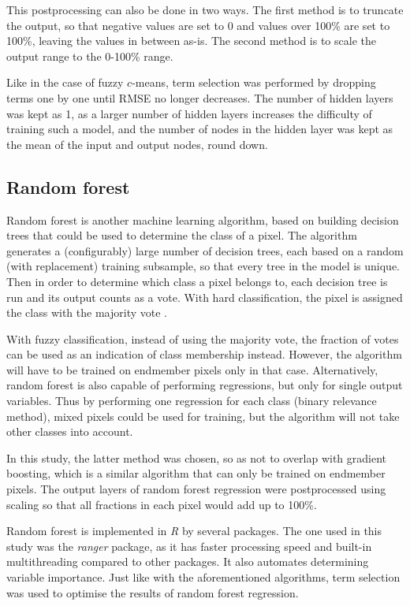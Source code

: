 \documentclass[a4paper,10pt]{book}
\begin{document}
This postprocessing can also be done in two ways. The first method is to truncate the output, so that negative values are set to 0 and values over 100\% are set to 100\%, leaving the values in between as-is. The second method is to scale the output range to the 0-100\% range.

Like in the case of fuzzy $c$-means, term selection was performed by dropping terms one by one until RMSE no longer decreases. The number of hidden layers was kept as 1, as a larger number of hidden layers increases the difficulty of training such a model, and the number of nodes in the hidden layer was kept as the mean of the input and output nodes, round down.

\subsection{Random forest}

Random forest is another machine learning algorithm, based on building decision trees that could be used to determine the class of a pixel. The algorithm generates a (configurably) large number of decision trees, each based on a random (with replacement) training subsample, so that every tree in the model is unique. Then in order to determine which class a pixel belongs to, each decision tree is run and its output counts as a vote. With hard classification, the pixel is assigned the class with the majority vote \citep{walton2008subpixelrf}.

With fuzzy classification, instead of using the majority vote, the fraction of votes can be used as an indication of class membership instead. However, the algorithm will have to be trained on endmember pixels only in that case. Alternatively, random forest is also capable of performing regressions, but only for single output variables. Thus by performing one regression for each class (binary relevance method), mixed pixels could be used for training, but the algorithm will not take other classes into account.

In this study, the latter method was chosen, so as not to overlap with gradient boosting, which is a similar algorithm that can only be trained on endmember pixels. The output layers of random forest regression were postprocessed using scaling so that all fractions in each pixel would add up to 100\%.

Random forest is implemented in \textit{R} by several packages. The one used in this study was the \textit{ranger} package, as it has faster processing speed and built-in multithreading compared to other packages. It also automates determining variable importance. Just like with the aforementioned algorithms, term selection was used to optimise the results of random forest regression.
\end{document}
